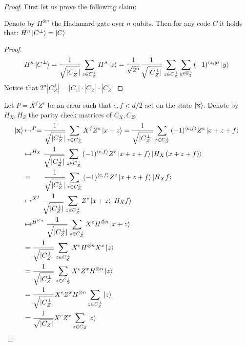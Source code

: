   \newcommand{\GZZZ}[1]{ \frac{1}{\sqrt{|C_{Z}^{\perp}|}} \sum_{z \in C_{Z}^{\perp}}{ #1 } } 
  \newcommand{\GZZZW}[2]{ \frac{1}{\sqrt{|C_{Z}^{\perp}|}} #2 \sum_{z \in C_{Z}^{\perp}}{ #1 } } 
  \newcommand{\GXXX}[1]{ \frac{1}{\sqrt{|C_{Z}|}} \sum_{z \in C_{Z}}{ #1 } } 
  \newcommand{\GXXXW}[2]{ \frac{1}{\sqrt{|C_{Z}|}} #2 \sum_{z \in C_{Z}}{ #1 } } 

\begin{proof}
  First let us prove the following claim: 
  \begin{claim}
    Denote by $H^{\otimes n}$ the Hadamard gate over $n$ qubits. Then for any code $C$ it holds that: $  H^{n}\ket{C^{\perp}} = \ket{C} $
        \end{claim}
  \begin{proof}
    \begin{equation*}
      H^{n}\ket{C^{\perp}} = \GZZZ{ H^{n}\ket{z} } = \frac{1}{ \sqrt{ 2^{n}}} \GZZZ{ \sum_{y\in \mathbb{F}_{2}^{n}}{ (-1)^{\braket{z,y}}  \ket{y}}  }
     \end{equation*}
     Notice that $ 2^{n}|C_{Z}^{\perp}| =  |C_{z}| \cdot |C_{Z}^{\perp}| \cdot |C_{Z}^{\perp}|$  
  \end{proof}
  Let $P = X^{f}Z^{e}$ be an error such that $e, f < d/2$ act on the state $\ket{\mathbf{x}}$. Denote by $H_{X}, H_{Z}$ the parity check matrices of $C_{X},C_{Z}$. 
    \begin{equation*}
    \begin{split}
      \ket{\mathbf{x}} &  \mapsto^{P} =  \frac{1}{\sqrt{|C_{Z}^{\perp}|}} \sum_{z \in C_{Z}^{\perp}}{ X^{f}Z^{e}\ket{ x + z }} = \frac{1}{\sqrt{|C_{Z}^{\perp}|}} \sum_{z \in C_{Z}^{\perp}}{ (-1)^{\braket{e,f} }Z^{e}\ket{ x + z + f}}\\
      & \mapsto^{H_{X}} \GZZZ{ (-1)^{\braket{e,f} }Z^{e}\ket{ x + z + f} \ket{ H_{X} \left(x + z + f\right) }  } \\ 
      & = \ \ \ \ \ \GZZZ{ (-1)^{\braket{e,f} }Z^{e}\ket{ x + z + f} \ket{ H_{X}f }  }\\
      & \mapsto^{X^{f}} \GZZZ{ Z^{e}\ket{ x + z} \ket{ H_{X}f }  }\\
      & \mapsto^{H^{\otimes n}} \GZZZ{  X^{e}H^{\otimes n}\ket{ x + z} } \\
      & = \GZZZ{  X^{e}H^{\otimes n} X^{x} \ket{ z} } \\
      & = \GZZZ{  X^{e} Z^{x} H^{\otimes n} \ket{ z} } \\
      & = \GZZZW{ \ket{ z} }{X^{e} Z^{x} H^{\otimes n} } \\
      & =  \GXXXW{  \ket{ z} }{ X^{e} Z^{x} } \\
    \end{split}
  \end{equation*}
\end{proof}

